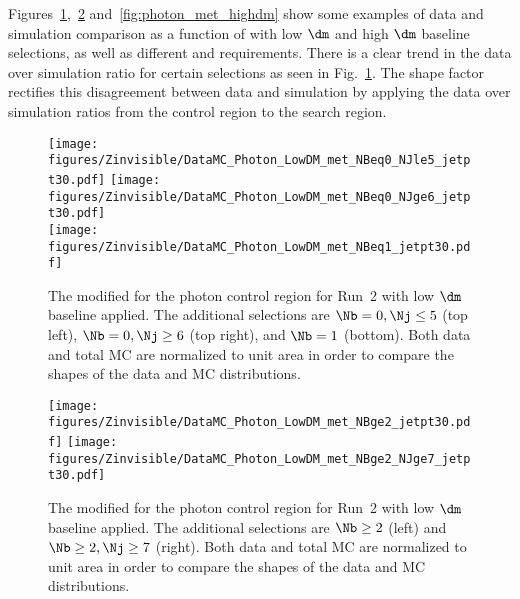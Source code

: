 Figures~\ref{fig:photon_met_lowdm_1},~\ref{fig:photon_met_lowdm_2} and~\ref{fig:photon_met_highdm} show some examples of data and simulation comparison as a function of \metphoton with low $\dm$ and high $\dm$ baseline selections, as well as different \Nb and \Nj requirements.
There is a clear trend in the data over simulation ratio for certain selections as seen in Fig.~\ref{fig:photon_met_lowdm_1}.
The shape factor rectifies this disagreement between data and simulation by applying the data over simulation ratios from the control region to the search region.

\begin{figure}[tbp]
{
\centering
\texttt{[image: figures/Zinvisible/DataMC\_Photon\_LowDM\_met\_NBeq0\_NJle5\_jetpt30.pdf]}
\texttt{[image: figures/Zinvisible/DataMC\_Photon\_LowDM\_met\_NBeq0\_NJge6\_jetpt30.pdf]}\\
\texttt{[image: figures/Zinvisible/DataMC\_Photon\_LowDM\_met\_NBeq1\_jetpt30.pdf]}
\caption[The modified \metphoton for the photon control region for Run~2 with low $\dm$ baseline applied]
{
    The modified \metphoton for the photon control region for Run~2 with low $\dm$ baseline applied.
    The additional selections are $\Nb=0, \Nj\leq5$ (top left), $\Nb=0, \Nj\geq6$ (top right), and $\Nb=1$ (bottom).
    Both data and total MC are normalized to unit area in order to compare the shapes of the data and MC \metphoton distributions.
}
\label{fig:photon_met_lowdm_1}
}
\end{figure}

\begin{figure}[tbp]
{
\centering
\texttt{[image: figures/Zinvisible/DataMC\_Photon\_LowDM\_met\_NBge2\_jetpt30.pdf]}
\texttt{[image: figures/Zinvisible/DataMC\_Photon\_LowDM\_met\_NBge2\_NJge7\_jetpt30.pdf]}
\caption[The modified \metphoton for the photon control region for Run~2 with low $\dm$ baseline applied]
{
    The modified \metphoton for the photon control region for Run~2 with low $\dm$ baseline applied.
    The additional selections are $\Nb\geq2$ (left) and $\Nb\geq2, \Nj\geq7$ (right).
    Both data and total MC are normalized to unit area in order to compare the shapes of the data and MC \metphoton distributions.
}
\label{fig:photon_met_lowdm_2}
}
\end{figure}

